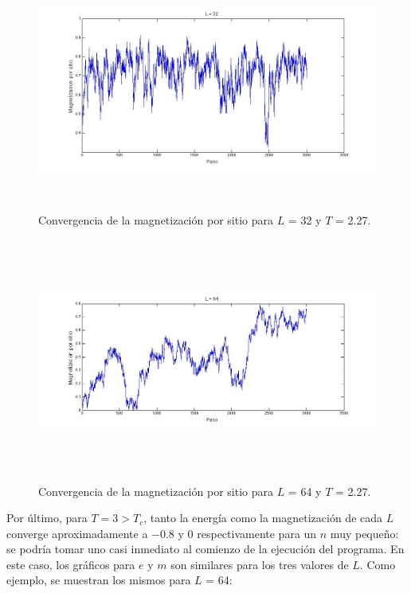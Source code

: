 \documentclass[a4paper,12pt]{article}
\begin{document}
\begin{figure}[H]
\begin{center}
\includegraphics[height=8cm]{../graficos/Mag_L32_T227.jpg}
\caption[width=5cm]{Convergencia de la magnetizaci\'on por sitio para $L$ = 32 y $T$ = 2.27.}
\end{center}
\end{figure}

\begin{figure}[H]
\begin{center}
\includegraphics[height=8cm]{../graficos/Mag_L64_T227.jpg}
\caption[width=5cm]{Convergencia de la magnetizaci\'on por sitio para $L$ = 64 y $T$ = 2.27.}
\end{center}
\end{figure}

Por \'ultimo, para $T = 3 > T_{c}$, tanto la energ\'ia como la magnetizaci\'on de cada $L$ converge aproximadamente a $-0.8$ y 0 respectivamente para un $n$ muy peque\~no: se podr\'ia tomar uno casi inmediato al comienzo de la ejecuci\'on del programa. En este caso, los gr\'aficos para $e$ y $m$ son similares para los tres valores de $L$. Como ejemplo, se muestran los mismos para $L$ = 64:
\end{document}
